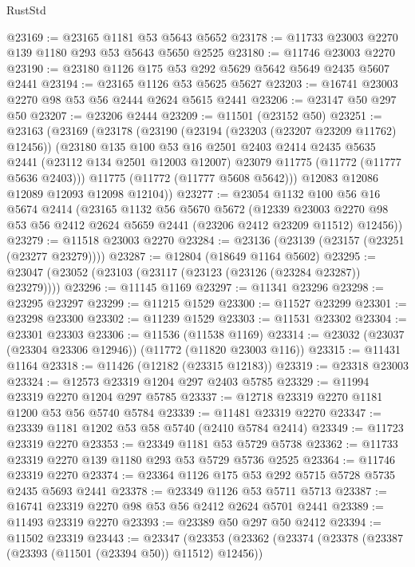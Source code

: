 \begin{lexlean}{RustStd}
\begin{coremodule}
@23169 := @23165 @1181 @53 @5643 @5652
@23178 := @11733 @23003 @2270 @139 @1180 @293 @53 @5643 @5650 @2525
@23180 := @11746 @23003 @2270
@23190 := @23180 @1126 @175 @53 @292 @5629 @5642 @5649 @2435 @5607 @2441
@23194 := @23165 @1126 @53 @5625 @5627
@23203 := @16741 @23003 @2270 @98 @53 @56 @2444 @2624 @5615 @2441
@23206 := @23147 @50 @297 @50
@23207 := @23206 @2444
@23209 := @11501 (@23152 @50)
@23251 := @23163
    (@23169
      (@23178
        (@23190
          (@23194 (@23203 (@23207 @23209 @11762) @12456))
          (@23180
            @135
            @100
            @53
            @16
            @2501
            @2403
            @2414
            @2435
            @5635
            @2441
            (@23112 @134 @2501 @12003 @12007)
            @23079
            @11775
            (@11772 (@11777 @5636 @2403)))
          @11775
          (@11772 (@11777 @5608 @5642)))
        @12083
        @12086
        @12089
        @12093
        @12098
        @12104))
@23277 := @23054
    @1132
    @100
    @56
    @16
    @5674
    @2414
    (@23165
      @1132
      @56
      @5670
      @5672
      (@12339 @23003 @2270 @98 @53 @56 @2412 @2624 @5659 @2441 (@23206 @2412 @23209 @11512) @12456))
@23279 := @11518 @23003 @2270
@23284 := @23136 (@23139 (@23157 (@23251 (@23277 @23279))))
@23287 := @12804 (@18649 @1164 @5602)
@23295 := @23047 (@23052 (@23103 (@23117 (@23123 (@23126 (@23284 @23287)) @23279))))
@23296 := @11145 @1169
@23297 := @11341 @23296
@23298 := @23295 @23297
@23299 := @11215 @1529
@23300 := @11527 @23299
@23301 := @23298 @23300
@23302 := @11239 @1529
@23303 := @11531 @23302
@23304 := @23301 @23303
@23306 := @11536 (@11538 @1169)
@23314 := @23032 (@23037 (@23304 @23306 @12946)) (@11772 (@11820 @23003 @116))
@23315 := @11431 @1164
@23318 := @11426 (@12182 (@23315 @12183))
@23319 := @23318 @23003
@23324 := @12573 @23319 @1204 @297 @2403 @5785
@23329 := @11994 @23319 @2270 @1204 @297 @5785
@23337 := @12718 @23319 @2270 @1181 @1200 @53 @56 @5740 @5784
@23339 := @11481 @23319 @2270
@23347 := @23339 @1181 @1202 @53 @58 @5740 (@2410 @5784 @2414)
@23349 := @11723 @23319 @2270
@23353 := @23349 @1181 @53 @5729 @5738
@23362 := @11733 @23319 @2270 @139 @1180 @293 @53 @5729 @5736 @2525
@23364 := @11746 @23319 @2270
@23374 := @23364 @1126 @175 @53 @292 @5715 @5728 @5735 @2435 @5693 @2441
@23378 := @23349 @1126 @53 @5711 @5713
@23387 := @16741 @23319 @2270 @98 @53 @56 @2412 @2624 @5701 @2441
@23389 := @11493 @23319 @2270
@23393 := @23389 @50 @297 @50 @2412
@23394 := @11502 @23319
@23443 := @23347
    (@23353
      (@23362
        (@23374
          (@23378 (@23387 (@23393 (@11501 (@23394 @50)) @11512) @12456))

\end{coremodule}
\end{lexlean}
